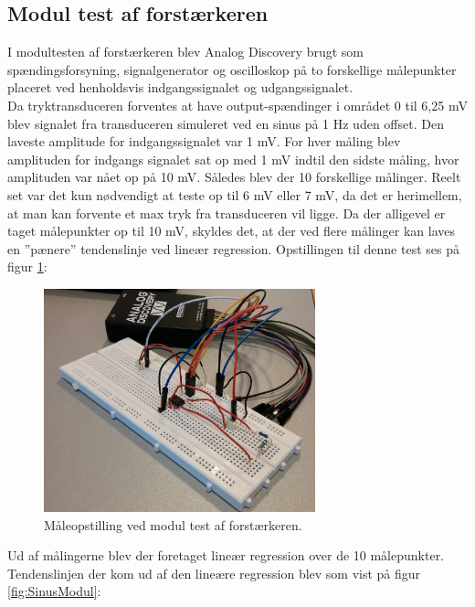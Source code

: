 \subsection{Modul test af forstærkeren}
I modultesten af forstærkeren blev Analog Discovery brugt som spændingsforsyning, signalgenerator og oscilloskop på to forskellige målepunkter placeret ved henholdsvis indgangssignalet og udgangssignalet.\\
Da tryktransduceren forventes at have output-spændinger i området 0 til 6,25 mV blev signalet fra transduceren simuleret ved en sinus på 1 Hz uden offset. Den laveste amplitude for indgangssignalet var 1 mV. For hver måling blev amplituden for indgangs signalet sat op med 1 mV indtil den sidste måling, hvor amplituden var nået op på 10 mV. Således blev der 10 forskellige målinger. Reelt set var det kun nødvendigt at teste op til 6 mV eller 7 mV, da det er herimellem, at man kan forvente et max tryk fra transduceren vil ligge. Da der alligevel er taget målepunkter op til 10 mV, skyldes det, at der ved flere målinger kan laves en ”pænere” tendenslinje ved lineær regression. Opstillingen til denne test ses på figur \ref{fig:ForstaerkerTest}:

\begin{figure}[H]
	\centering
	\includegraphics[width=0.7\textwidth]{Figurer/Hardware/ForstaerkerTest}
	\caption{Måleopstilling ved modul test af forstærkeren.}
	\label{fig:ForstaerkerTest}
\end{figure}

Ud af målingerne blev der foretaget lineær regression over de 10 målepunkter. Tendenslinjen der kom ud af den lineære regression blev som vist på figur \ref{fig:SinusModul}:


